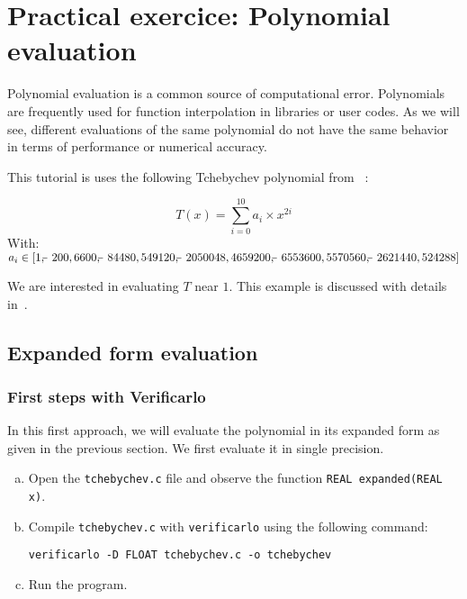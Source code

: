 \section{Practical exercice: Polynomial evaluation}

Polynomial evaluation is a common source of computational error. Polynomials are frequently used for function interpolation in libraries or user codes. As we will see, different evaluations of the same polynomial do not have the same behavior in terms of performance or numerical accuracy.

This tutorial is uses the following Tchebychev polynomial from ~\cite[pp.52-54]{parker1997monte}:

$$T(x)=\sum_{i=0}^{10}{a_i \times x^{2i}}$$
With:
$a_i \in [
  1,
  \matminus 200,
  6600,
  \matminus 84480,
  549120,
  \matminus 2050048,
  4659200,
  \matminus 6553600,
  5570560,
  \matminus 2621440,
  524288
]$

We are interested in evaluating  $T$ near $1$.
This example is discussed with details in~\cite[pp.52-54]{parker1997monte}.

\subsection{Expanded form evaluation}

\subsubsection{First steps with Verificarlo}

In this first approach, we will evaluate the polynomial in its expanded form as given in the previous section. We first evaluate it in single precision.

\begin{question}
  \begin{enumerate}[(a)]
  \item Open the {\tt tchebychev.c} file and observe the function {\tt REAL expanded(REAL x)}.

  \item Compile {\tt tchebychev.c} with {\tt verificarlo} using the following command:
\begin{verbatim}
verificarlo -D FLOAT tchebychev.c -o tchebychev
\end{verbatim}
  \item Run the program.
  \end{enumerate}
\end{question}

